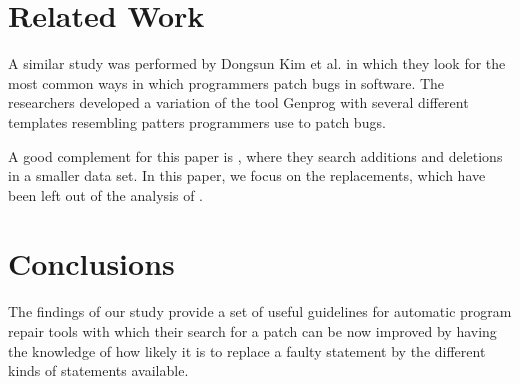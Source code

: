 \documentclass{sig-alternate-05-2015}
\begin{document}
\section{Related Work}
A similar study was performed by Dongsun Kim et al. \cite{dongsun} in which they look for the most common ways in which programmers patch bugs in software. The researchers developed a variation of the tool Genprog \cite{weimer}\cite{claire} with several different templates resembling patters programmers use to patch bugs. 

A good complement for this paper is \cite{hao}, where they search additions and deletions in a smaller data set. In this paper, we focus on the replacements, which have been left out of the analysis of \cite{hao}. 



\section{Conclusions}
The findings of our study provide a set of useful guidelines for automatic program repair tools with which their search for a patch can be now improved by having the knowledge of how likely it is to replace a faulty statement by the different kinds of statements available.




%

%
%
\end{document}
